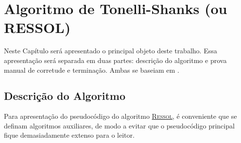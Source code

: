 \chapter{Algoritmo de Tonelli-Shanks (ou RESSOL)}
\label{cap:tonelli-shanks}

Neste Capítulo será apresentado o principal objeto deste trabalho. Essa apresentação será separada em duas partes: descrição do algoritmo e prova manual de corretude e terminação. Ambas se baseiam em \cite{Huynh1581080}.

\section{Descrição do Algoritmo}
Para apresentação do pseudocódigo do algoritmo \hyperref[algo:ressol]{\textsc{Ressol}}, é conveniente que se definam algoritmos auxiliares, de modo a evitar que o pseudocódigo principal fique demasiadamente extenso para o leitor.

